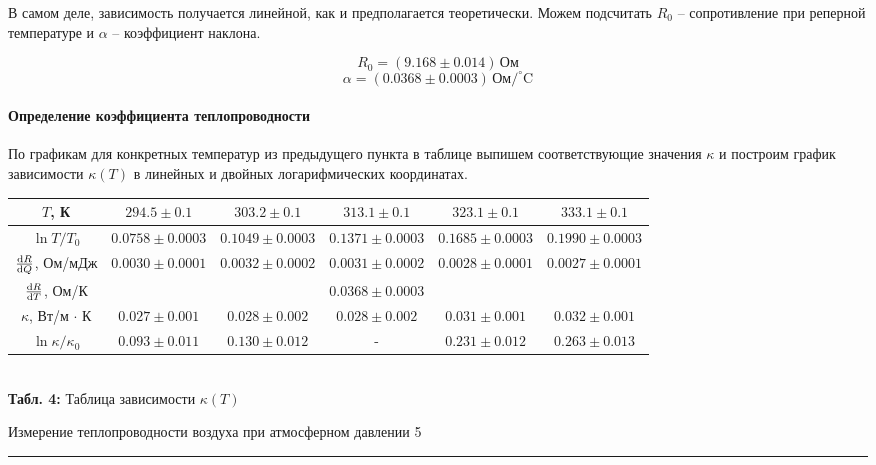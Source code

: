 \documentclass[12pt,a4paper]{scrartcl}
\begin{document}
	В самом деле, зависимость получается линейной, как и предполагается теоретически. Можем подсчитать $R_0$ -- сопротивление при реперной температуре и $\alpha$ -- коэффициент наклона.
	
	$$R_0 = (9.168 \pm 0.014)\,\text{Ом}$$
	$$\alpha = (0.0368 \pm 0.0003)\,\text{Ом}/^\circ \text{C}$$
	
	\paragraph{Определение коэффициента теплопроводности} \hfill
	
	По графикам для конкретных температур из предыдущего пункта в таблице выпишем соответствующие значения $\kappa$ и построим график зависимости $\kappa(T)$ в линейных и двойных логарифмических координатах.
	
	\begin{center}
		\begin{tabular}{|c|c|c|c|c|c|}
			\hline
			$T$, К & $294.5 \pm 0.1$ & $303.2 \pm 0.1$ & $313.1 \pm 0.1$ & $323.1 \pm 0.1$ & $333.1 \pm 0.1$
			\\\hline
			$\ln T/T_0$ & $0.0758 \pm 0.0003$ & $0.1049 \pm 0.0003$ & $0.1371 \pm 0.0003$ & $0.1685 \pm 0.0003$ & $0.1990 \pm 0.0003$
			\\\hline
			$\frac{\mathrm{d} R}{\mathrm{d} Q}$, Ом/мДж & $0.0030 \pm 0.0001$ & $0.0032 \pm 0.0002$ & $0.0031 \pm 0.0002$ & $0.0028 \pm 0.0001$ & $0.0027 \pm 0.0001$
			\\\hline
			$\frac{\mathrm{d} R}{\mathrm{d} T}$, Ом/К & \multicolumn{5}{|c|}{$0.0368 \pm 0.0003$}
			\\\hline
			$\kappa$, Вт/м$\,\cdot\,$К & $0.027 \pm 0.001$ & $0.028 \pm 0.002$ & $0.028 \pm 0.002$ & $0.031 \pm 0.001$ & $0.032 \pm 0.001$
			\\\hline
			$\ln \kappa/\kappa_0$ & $0.093 \pm 0.011$ & $0.130 \pm 0.012$ & - & $0.231 \pm 0.012$ & $0.263 \pm 0.013$
			\\\hline 
		\end{tabular}
		\\\textbf{Табл. 4:} Таблица зависимости $\kappa(T)$
	\end{center}
	
	\newpage
	
	
	\begin{flushleft}
		\footnotesize{Измерение теплопроводности воздуха при атмосферном давлении} \hspace{\fill} \footnotesize{5}
		\\[-0.3cm]\noindent\rule{\textwidth}{0.3pt}
	\end{flushleft}
	
\end{document}
